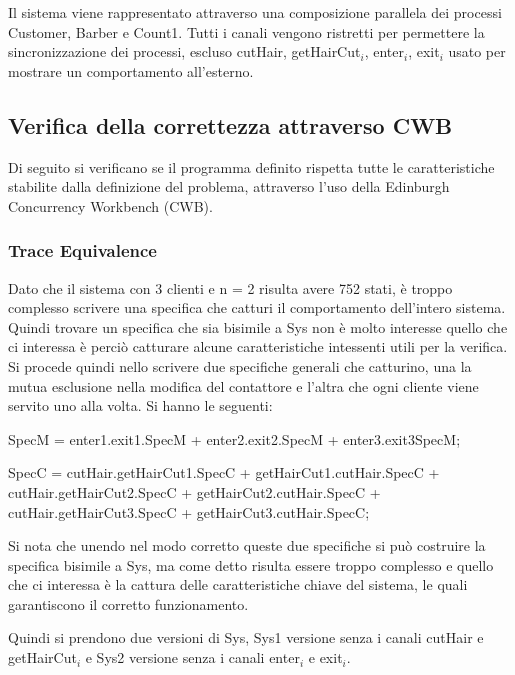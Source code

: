 Il sistema viene rappresentato attraverso una composizione parallela dei processi \textsf{Customer, Barber e Count1}. Tutti i canali vengono ristretti per permettere la sincronizzazione dei processi, escluso \textsf{cutHair, getHairCut$_{i}$, enter$_{i}$, exit$_{i}$} usato per mostrare un comportamento all'esterno.

\subsection{Verifica della correttezza attraverso CWB }

Di seguito si verificano se il programma definito rispetta tutte le caratteristiche stabilite dalla definizione del problema, attraverso l'uso della Edinburgh Concurrency Workbench (CWB).

\subsubsection{Trace Equivalence} 

Dato che il sistema con 3 clienti e n = 2 risulta avere 752 stati, è troppo complesso scrivere una specifica che catturi il comportamento dell'intero sistema. Quindi trovare un specifica che sia bisimile a \textsf{Sys} non è molto interesse quello che ci interessa è perciò catturare alcune caratteristiche intessenti utili per la verifica. Si procede quindi nello scrivere due specifiche generali che catturino, una la mutua esclusione nella modifica del contattore e l'altra che ogni cliente viene servito uno alla volta. Si hanno le seguenti:

\textsf{SpecM = enter1.exit1.SpecM + enter2.exit2.SpecM + enter3.exit3SpecM;}

\textsf{SpecC = cutHair.getHairCut1.SpecC + getHairCut1.cutHair.SpecC + \\cutHair.getHairCut2.SpecC + getHairCut2.cutHair.SpecC + \\cutHair.getHairCut3.SpecC + getHairCut3.cutHair.SpecC;}

Si nota che unendo nel modo corretto queste due specifiche si può costruire la specifica bisimile a \textsf{Sys}, ma come detto risulta essere troppo complesso e quello che ci interessa è la cattura delle caratteristiche chiave del sistema, le quali garantiscono il corretto funzionamento.

Quindi si prendono due versioni di \textsf{Sys}, \textsf{Sys1} versione senza i canali \textsf{cutHair} e \textsf{getHairCut$_{i}$} e \textsf{Sys2} versione senza i canali \textsf{enter$_{i}$} e \textsf{exit$_{i}$}.

